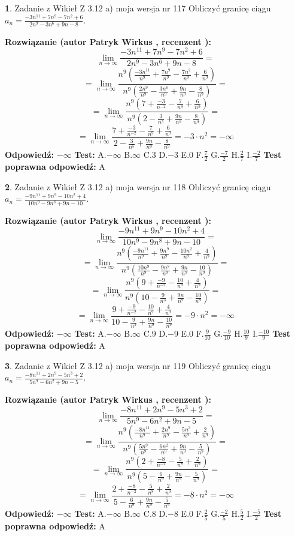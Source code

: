 \documentclass[12pt, a4paper]{article}
\theoremstyle{definition} %
\newtheorem{zad}{}
\newcommand{\zadStart}[1]{\begin{zad}#1\newline}
\newcommand{\zadStop}{\end{zad}}
\newcommand{\rozwStart}[2]{\noindent \textbf{Rozwiązanie (autor #1 , recenzent #2): }\newline}
\newcommand{\rozwStop}{\newline}
\newcommand{\odpStart}{\noindent \textbf{Odpowiedź:}\newline}
\newcommand{\odpStop}{\newline}
\newcommand{\testStart}{\noindent \textbf{Test:}\newline}
\newcommand{\testStop}{\newline}
\newcommand{\kluczStart}{\noindent \textbf{Test poprawna odpowiedź:}\newline}
\newcommand{\kluczStop}{\newline}
\begin{document}
\zadStart{Zadanie z Wikieł Z 3.12 a) moja wersja nr 117}
Obliczyć granicę ciągu $a_{n}=\frac{-3n^{11}+7n^{9}-7n^{2}+6}{2n^{9}-3n^{6}+9n-8}$.
\zadStop
\rozwStart{Patryk Wirkus}{}
$$\lim\limits_{n\to\infty}\frac{-3n^{11}+7n^{9}-7n^{2}+6}{2n^{9}-3n^{6}+9n-8}=$$
$$=\lim\limits_{n\to\infty}\frac{n^{9}\left(\frac{-3n^{11}}{n^{9}}+\frac{7n^{9}}{n^{9}}-\frac{7n^{2}}{n^{9}}+\frac{6}{n^{9}}\right)}{n^{9}\left(\frac{2n^{9}}{n^{9}}-\frac{3n^{6}}{n^{9}}+\frac{9n}{n^{9}}-\frac{8}{n^{9}}\right)}=$$
$$=\lim\limits_{n\to\infty}\frac{n^{9}\left(7+\frac{-3}{n^{-2}}-\frac{7}{n^{9}}+\frac{6}{n^{9}}\right)}
{n^{9}\left(2-\frac{3}{n^{5}}+\frac{9n}{n^{9}}-\frac{8}{n^{9}}\right)}=$$
$$=\lim\limits_{n\to\infty}\frac{7+\frac{-3}{n^{-2}}-\frac{7}{n^{9}}+\frac{6}{n^{9}}}{2-\frac{3}{n^{5}}+\frac{9n}{n^{9}}-\frac{8}{n^{9}}}=-3\cdot n^{2} = -\infty$$
\rozwStop
\odpStart
$-\infty$
\odpStop
\testStart
A.$-\infty$
B.$\infty$
C.$3$
D.$-3$
E.$0$
F.$\frac{7}{2}$
G.$\frac{-7}{2}$
H.$\frac{2}{7}$
I.$\frac{-2}{7}$
\testStop
\kluczStart
A
\kluczStop



\zadStart{Zadanie z Wikieł Z 3.12 a) moja wersja nr 118}
Obliczyć granicę ciągu $a_{n}=\frac{-9n^{11}+9n^{9}-10n^{2}+4}{10n^{9}-9n^{8}+9n-10}$.
\zadStop
\rozwStart{Patryk Wirkus}{}
$$\lim\limits_{n\to\infty}\frac{-9n^{11}+9n^{9}-10n^{2}+4}{10n^{9}-9n^{8}+9n-10}=$$
$$=\lim\limits_{n\to\infty}\frac{n^{9}\left(\frac{-9n^{11}}{n^{9}}+\frac{9n^{9}}{n^{9}}-\frac{10n^{2}}{n^{9}}+\frac{4}{n^{9}}\right)}{n^{9}\left(\frac{10n^{9}}{n^{9}}-\frac{9n^{8}}{n^{9}}+\frac{9n}{n^{9}}-\frac{10}{n^{9}}\right)}=$$
$$=\lim\limits_{n\to\infty}\frac{n^{9}\left(9+\frac{-9}{n^{-2}}-\frac{10}{n^{9}}+\frac{4}{n^{9}}\right)}
{n^{9}\left(10-\frac{9}{n^{3}}+\frac{9n}{n^{9}}-\frac{10}{n^{9}}\right)}=$$
$$=\lim\limits_{n\to\infty}\frac{9+\frac{-9}{n^{-2}}-\frac{10}{n^{9}}+\frac{4}{n^{9}}}{10-\frac{9}{n^{3}}+\frac{9n}{n^{9}}-\frac{10}{n^{9}}}=-9\cdot n^{2} = -\infty$$
\rozwStop
\odpStart
$-\infty$
\odpStop
\testStart
A.$-\infty$
B.$\infty$
C.$9$
D.$-9$
E.$0$
F.$\frac{9}{10}$
G.$\frac{-9}{10}$
H.$\frac{10}{9}$
I.$\frac{-10}{9}$
\testStop
\kluczStart
A
\kluczStop



\zadStart{Zadanie z Wikieł Z 3.12 a) moja wersja nr 119}
Obliczyć granicę ciągu $a_{n}=\frac{-8n^{11}+2n^{9}-5n^{3}+2}{5n^{9}-6n^{2}+9n-5}$.
\zadStop
\rozwStart{Patryk Wirkus}{}
$$\lim\limits_{n\to\infty}\frac{-8n^{11}+2n^{9}-5n^{3}+2}{5n^{9}-6n^{2}+9n-5}=$$
$$=\lim\limits_{n\to\infty}\frac{n^{9}\left(\frac{-8n^{11}}{n^{9}}+\frac{2n^{9}}{n^{9}}-\frac{5n^{3}}{n^{9}}+\frac{2}{n^{9}}\right)}{n^{9}\left(\frac{5n^{9}}{n^{9}}-\frac{6n^{2}}{n^{9}}+\frac{9n}{n^{9}}-\frac{5}{n^{9}}\right)}=$$
$$=\lim\limits_{n\to\infty}\frac{n^{9}\left(2+\frac{-8}{n^{-2}}-\frac{5}{n^{8}}+\frac{2}{n^{9}}\right)}
{n^{9}\left(5-\frac{6}{n^{9}}+\frac{9n}{n^{9}}-\frac{5}{n^{9}}\right)}=$$
$$=\lim\limits_{n\to\infty}\frac{2+\frac{-8}{n^{-2}}-\frac{5}{n^{8}}+\frac{2}{n^{9}}}{5-\frac{6}{n^{9}}+\frac{9n}{n^{9}}-\frac{5}{n^{9}}}=-8\cdot n^{2} = -\infty$$
\rozwStop
\odpStart
$-\infty$
\odpStop
\testStart
A.$-\infty$
B.$\infty$
C.$8$
D.$-8$
E.$0$
F.$\frac{2}{5}$
G.$\frac{-2}{5}$
H.$\frac{5}{2}$
I.$\frac{-5}{2}$
\testStop
\kluczStart
A
\kluczStop
\end{document}
